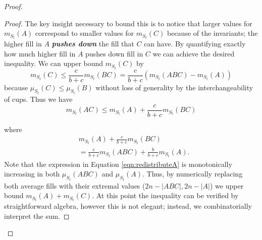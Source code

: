 \documentclass[twocolumn]{article}[10pt]
\newcommand{\defn}[1]{{\textit{\textbf{\boldmath #1}}}\xspace}
\begin{document}
\begin{proof}
\begin{proof}
The key insight necessary to bound this is to notice that larger values for
$m_{S_t}(A)$ correspond to smaller values for $m_{S_t}(C)$ because of the
invariants; the higher fill in $A$ \defn{pushes down} the fill that $C$ can
have. By quantifying exactly how much higher fill in $A$ pushes down fill in
$C$ we can achieve the desired inequality.
We can upper bound $m_{S_t}(C)$ by 
$$m_{S_t}(C) \le \frac{c}{b+c}m_{S_t}(BC) = \frac{c}{b+c}(m_{S_t}(ABC) - m_{S_t}(A))$$ because
$\mu_{S_t}(C) \le \mu_{S_t}(B)$ without loss of generality by the
interchangeability of cups.
Thus we have 
\begin{equation}
  \label{eqn:BCdiscounted}
m_{S_t}(AC) \le m_{S_t}(A) + \frac{c}{b+c}m_{S_t}(BC)
\end{equation}
{\color{red}
where 
\begin{equation}
  \label{eqn:redistributeA}
\begin{split}
  &m_{S_t}(A) + \frac{c}{b+c}m_{S_t}(BC) \\
  &= \frac{c}{b+c}m_{S_t}(ABC) + \frac{b}{b+c}m_{S_t}(A).
\end{split}
\end{equation}
Note that the expression in Equation \ref{eqn:redistributeA} is monotonically
increasing in both $\mu_{S_t}(ABC)$ and $\mu_{S_t}(A)$. 
Thus, by numerically replacing both average fills with
their extremal values ($2n-|ABC|, 2n-|A|$) we upper bound $m_{S_t}(A) + m_{S_t}(C)$.
At this point the inequality can be verified by straightforward algebra,
however this is not elegant; instead, we combinatorially interpret the sum.

}
\end{proof}
\end{proof}
\end{document}
